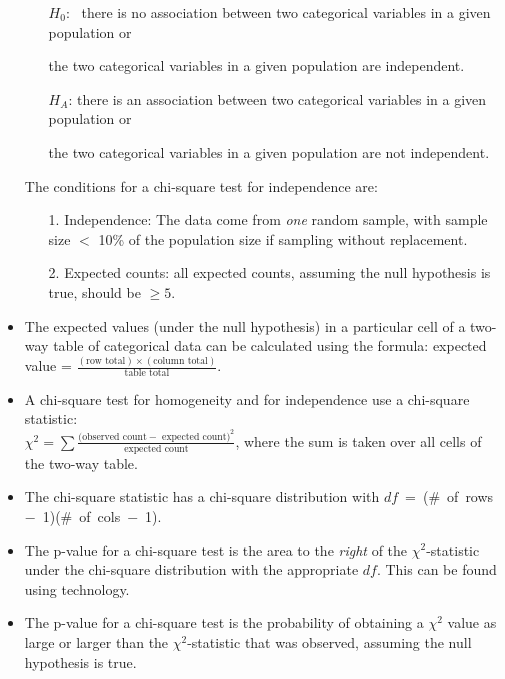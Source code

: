 \begin{itemize}
\begin{itemize}
\setlength{\itemindent}{3mm}
\item[$H_0$:]\, there is no association between two categorical variables in a given population or 
\item[] the two categorical variables in a given population are
independent. 
\item[$H_A$:] there is an association between two
categorical variables in a given population or 
\item[]the two categorical variables in a
given population are not independent.
\end{itemize}

The conditions for a chi-square test for
independence are:\begin{itemize}
\item[1.] Independence:  The data come from \emph{one} random sample, with sample size $<$ 10\% of the population size if sampling without replacement.
\item[2.]  Expected counts: all expected counts, assuming the null hypothesis is true, should be \mbox{$\ge 5$.}  
\end{itemize}

\item The expected values (under the null hypothesis) in a particular cell of a two-way
table of categorical data can be calculated using the formula:  expected value = $\frac{(\text{row total})\times (\text{column total})}{\text{table total}}$.  

\item A chi-square test for homogeneity and for independence use a chi-square statistic:  \\
$\chi^2 =\sum{ \frac{\text{(observed count} - \text{ expected count})^2}{\text{expected count}}}$,
where the sum is taken over all cells of the two-way table.

\item The chi-square statistic has a chi-square distribution with \mbox{$df$ = (\# of rows $-$ 1)(\# of cols $-$ 1).}

\item The p-value for a chi-square test is the area to the \emph{right} of the $\chi^2$-statistic under the chi-square distribution with the appropriate $df$.  This can be found using technology.

\item The p-value for a chi-square test is the probability of obtaining a $\chi^2$ value as large or larger than the $\chi^2$-statistic that was observed, assuming the null hypothesis is true.


\end{itemize}
